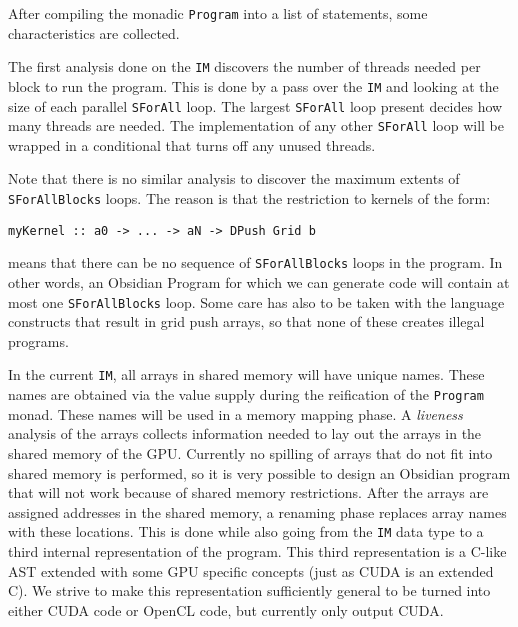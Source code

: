 After compiling the monadic {\tt Program} into a list of statements, 
some characteristics are collected. 

The first analysis done on the {\tt IM} 
discovers the number of threads needed per block to run the program. This 
is done by a pass over the {\tt IM} and looking at the size  
of each parallel {\tt SForAll} loop. The largest {\tt SForAll} loop present 
decides how many threads are needed. The implementation of any other 
{\tt SForAll} loop will be wrapped in a conditional that turns 
off any unused threads.

Note that there is no similar analysis to discover the maximum extents 
of {\tt SForAllBlocks} loops. The reason is that the restriction
to kernels of the form: 

\begin{small} 
\begin{Verbatim}[samepage=true]
myKernel :: a0 -> ... -> aN -> DPush Grid b 
\end{Verbatim} 
\end{small} 

\noindent means that there can be no sequence of {\tt SForAllBlocks} loops in the program. In other 
words, an Obsidian Program for which we can generate code will contain at most 
one {\tt SForAllBlocks} loop. Some care has also to be taken with
the language constructs that result in grid push arrays, so that none of these 
creates illegal programs.


In the current {\tt IM}, all arrays in shared memory will have unique 
names. These names are obtained via the value supply during the reification 
of the {\tt Program} monad. These names will be used in a memory mapping phase.
A {\em liveness} analysis of the arrays collects information needed to lay 
out the arrays in the shared memory of the GPU. Currently no spilling of 
arrays that do not fit into shared memory is performed, so it is very possible 
to design an Obsidian program that will not work because of shared memory 
restrictions. After the arrays are assigned addresses in the shared memory,
a renaming phase replaces array names with these locations. This is done 
while also going from the {\tt IM} data type to a third internal representation 
of the program. This third representation is a C-like AST extended with some 
GPU specific concepts (just as CUDA is an extended C). We strive to make this representation sufficiently general to be turned into 
either CUDA code or OpenCL code, but currently only output CUDA.   

